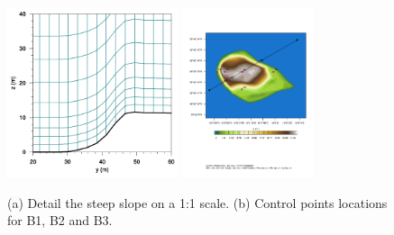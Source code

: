 \begin{figure}[H]
	\centering
	\includegraphics[height=5cm,trim={0cm 0cm 0cm 0cm},clip]{Imagenes/05/hd_mesh_50}
	\includegraphics[height=5cm,page=1,trim={3.4cm 9.3cm 1cm 4cm},clip]{Imagenes/05/bol_control_point.pdf}%
	
	\caption{(a) Detail the steep slope on a 1:1 scale. (b) Control points locations for B1, B2 and B3. }
	\label{fig:05_mesh_bol}
\end{figure}

